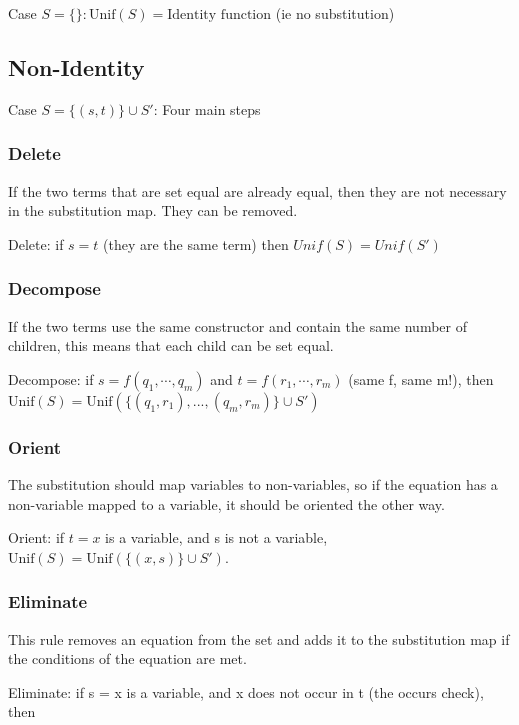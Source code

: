 Case $S = \{ \} : \text{Unif}(S) = \text{Identity function}$ (ie
no substitution)

\subsection{Non-Identity}

Case $S = \{(s, t)\} \cup S'$: Four main steps

\subsubsection{Delete}

If the two terms that are set equal are already equal, then they are not necessary in the substitution map. They can be removed.

Delete: if $s = t$ (they are the same term)
then $Unif(S) = Unif(S')$

\subsubsection{Decompose}

If the two terms use the same constructor and contain the same number of children, this means that each child can be set equal. 

Decompose: if $s = f(q_1, \cdots, q_m )$ and
$t = f(r_1, \cdots, r_m )$ (same f, same m!), then
$\text{Unif}(S) = \text{Unif}(\{(q_1 , r_1 ), ..., (q_m , r_m )\} \cup S')$

\subsubsection{Orient}

The substitution should map variables to non-variables, so if the equation has a non-variable mapped to a variable, it should be oriented the other way.

Orient: if $t = x$ is a variable, and s is not a
variable, $\text{Unif}(S) = \text{Unif} (\{(x,s)\} \cup S')$.

\subsubsection{Eliminate}

This rule removes an equation from the set and adds it to the substitution map if the conditions of the equation are met.

Eliminate: if s = x is a variable, and
x does not occur in t (the occurs
check), then

